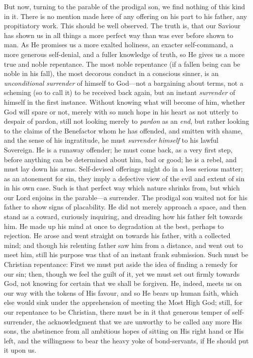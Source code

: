 But now, turning to the parable of the prodigal son, we find
nothing of this kind in it. There is no mention made here of any
offering on his part to his father, any propitiatory work. This should
be well observed. The truth is, that our Saviour has shown us in all
things a more perfect way than was ever before shown to man. As He
promises us a more exalted holiness, an exacter self-command, a more
generous self-denial, and a fuller knowledge of truth, so He gives us
a more true and noble repentance. The most noble repentance (if a
fallen being can be noble in his fall), the most decorous conduct in a
conscious sinner, is an \emph{unconditional surrender} of himself to
God—not a bargaining about terms, not a scheming (so to call it) to
be received back again, but an instant \emph{surrender} of himself in
the first instance. Without knowing what will become of him, whether
God will spare or not, merely with so much hope in his heart as not
utterly to despair of pardon, still not looking merely to \emph{pardon}
as an \emph{end}, but rather looking to the claims of the Benefactor
whom he has offended, and smitten with shame, and the sense of his
ingratitude, he must \emph{surrender himself} to his lawful Sovereign.
He is a runaway offender; he must come back, as a very first step,
before anything can be determined about him, bad or good; he is a
rebel, and must lay down his arms. Self-devised offerings might do in
a less serious matter; as an atonement for sin, they imply a defective
view of the evil and extent of sin in his own case. Such is that
perfect way which nature shrinks from, but which our Lord enjoins in
the parable—a surrender. The prodigal son waited not for his father
to show signs of placability. He did not merely approach a space, and
then stand as a coward, curiously inquiring, and dreading how his
father felt towards him. He made up his mind at once to degradation at
the best, perhaps to rejection. He arose and went straight on towards
his father, with a collected mind; and though his relenting father saw
him from a distance, and went out to meet him, still his purpose was
that of an instant frank submission. Such must be Christian
repentance: First we must put aside the idea of finding a remedy for
our sin; then, though we feel the guilt of it, yet we must set out
firmly towards God, not knowing for certain that we shall be forgiven.
He, indeed, meets us on our way with the tokens of His favour, and so
He bears up human faith, which else would sink under the apprehension
of meeting the Most High God; still, for our repentance to be
Christian, there must be in it that generous temper of self-surrender,
the acknowledgment that we are unworthy to be called any more His
sons, the abstinence from all ambitious hopes of sitting on His right
hand or His left, and the willingness to bear the heavy yoke of
bond-servants, if He should put it upon us.

